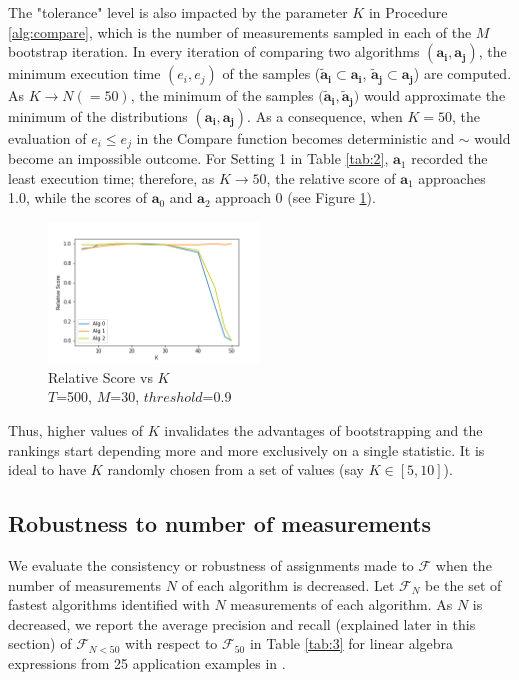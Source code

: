 \documentclass[conference]{IEEEtran}
\begin{document}
The "tolerance" level is also impacted by the parameter $K$ in Procedure \ref{alg:compare}, which is the number of measurements sampled in each of the $M$ bootstrap iteration. In every iteration of comparing two algorithms $(\mathbf{a_i}, \mathbf{a_j})$, the minimum execution time $(e_i,e_j)$ of the samples ($\mathbf{\tilde{a}_i} \subset \mathbf{a_i}$, $\mathbf{\tilde{a}_j} \subset \mathbf{a_j}$) are computed. As $K \to N (=50)$, the minimum of the samples $(\mathbf{\tilde{a}_i},\mathbf{\tilde{a}_j)}$ would approximate the minimum of the distributions $(\mathbf{a_i}, \mathbf{a_j})$. As a consequence, when $K=50$, the evaluation of $e_i \le e_j$ in the Compare function becomes deterministic and $\sim$ would become an impossible outcome. For Setting 1 in Table \ref{tab:2}, $\mathbf{a}_1$ recorded the least execution time; therefore, as $K \to 50$, the relative score of $\mathbf{a}_1$ approaches 1.0, while the scores of $\mathbf{a}_0$ and $\mathbf{a}_2$ approach 0 (see Figure \ref{fig:k}). 
\begin{figure}[h!]
	\includegraphics[width=0.5\textwidth]{fig/k}
	\caption{Relative Score vs $K$ \\ $T$=500, $M$=30, $threshold$=0.9}
	\label{fig:k}     
\end{figure}
Thus, higher values of $K$ invalidates the advantages of bootstrapping and  the rankings start depending more and more exclusively on a single statistic. It is ideal to have $K$ randomly chosen from a set of values (say $K \in [5,10]$).

\subsection{Robustness to number of measurements}

We evaluate the consistency or robustness of assignments made to $\mathcal{F}$ when the number of measurements $N$ of each algorithm is decreased. Let $\mathcal{F}_{N}$ be the set of fastest algorithms identified with $N$ measurements of each algorithm. As $N$ is decreased, we report the average precision and recall (explained later in this section) of $\mathcal{F}_{N<50} $ with respect to $\mathcal{F}_{50}$ in Table \ref{tab:3} for linear algebra expressions from 25 application examples in \cite{barthels2019linnea}.
\end{document}
